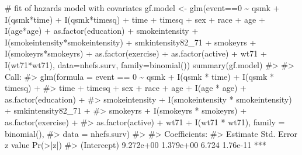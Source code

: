 \documentclass[
  10pt,
  a4paper,
]{book}
\newenvironment{Shaded}{\begin{snugshade}}{\end{snugshade}}
\newcommand{\AttributeTok}[1]{\textcolor[rgb]{0.40,0.45,0.13}{#1}}
\newcommand{\CommentTok}[1]{\textcolor[rgb]{0.37,0.37,0.37}{#1}}
\newcommand{\DecValTok}[1]{\textcolor[rgb]{0.68,0.00,0.00}{#1}}
\newcommand{\FunctionTok}[1]{\textcolor[rgb]{0.28,0.35,0.67}{#1}}
\newcommand{\NormalTok}[1]{\textcolor[rgb]{0.00,0.46,0.62}{#1}}
\newcommand{\OtherTok}[1]{\textcolor[rgb]{0.00,0.46,0.62}{#1}}
\newcommand{\SpecialCharTok}[1]{\textcolor[rgb]{0.37,0.37,0.37}{#1}}
\begin{document}
\begin{Shaded}
\begin{Highlighting}[]
\CommentTok{\# fit of hazards model with covariates}
\NormalTok{gf.model }\OtherTok{\textless{}{-}} \FunctionTok{glm}\NormalTok{(event}\SpecialCharTok{==}\DecValTok{0} \SpecialCharTok{\textasciitilde{}}\NormalTok{ qsmk }\SpecialCharTok{+} \FunctionTok{I}\NormalTok{(qsmk}\SpecialCharTok{*}\NormalTok{time) }\SpecialCharTok{+} \FunctionTok{I}\NormalTok{(qsmk}\SpecialCharTok{*}\NormalTok{timesq)}
                \SpecialCharTok{+}\NormalTok{ time }\SpecialCharTok{+}\NormalTok{ timesq }\SpecialCharTok{+}\NormalTok{ sex }\SpecialCharTok{+}\NormalTok{ race }\SpecialCharTok{+}\NormalTok{ age }\SpecialCharTok{+} \FunctionTok{I}\NormalTok{(age}\SpecialCharTok{*}\NormalTok{age)}
                \SpecialCharTok{+} \FunctionTok{as.factor}\NormalTok{(education) }\SpecialCharTok{+}\NormalTok{ smokeintensity}
                \SpecialCharTok{+} \FunctionTok{I}\NormalTok{(smokeintensity}\SpecialCharTok{*}\NormalTok{smokeintensity) }\SpecialCharTok{+}\NormalTok{ smkintensity82\_71}
                \SpecialCharTok{+}\NormalTok{ smokeyrs }\SpecialCharTok{+} \FunctionTok{I}\NormalTok{(smokeyrs}\SpecialCharTok{*}\NormalTok{smokeyrs) }\SpecialCharTok{+} \FunctionTok{as.factor}\NormalTok{(exercise)}
                \SpecialCharTok{+} \FunctionTok{as.factor}\NormalTok{(active) }\SpecialCharTok{+}\NormalTok{ wt71 }\SpecialCharTok{+} \FunctionTok{I}\NormalTok{(wt71}\SpecialCharTok{*}\NormalTok{wt71),}
                \AttributeTok{data=}\NormalTok{nhefs.surv, }\AttributeTok{family=}\FunctionTok{binomial}\NormalTok{())}
\FunctionTok{summary}\NormalTok{(gf.model)}
\CommentTok{\#\textgreater{} }
\CommentTok{\#\textgreater{} Call:}
\CommentTok{\#\textgreater{} glm(formula = event == 0 \textasciitilde{} qsmk + I(qsmk * time) + I(qsmk * timesq) + }
\CommentTok{\#\textgreater{}     time + timesq + sex + race + age + I(age * age) + as.factor(education) + }
\CommentTok{\#\textgreater{}     smokeintensity + I(smokeintensity * smokeintensity) + smkintensity82\_71 + }
\CommentTok{\#\textgreater{}     smokeyrs + I(smokeyrs * smokeyrs) + as.factor(exercise) + }
\CommentTok{\#\textgreater{}     as.factor(active) + wt71 + I(wt71 * wt71), family = binomial(), }
\CommentTok{\#\textgreater{}     data = nhefs.surv)}
\CommentTok{\#\textgreater{} }
\CommentTok{\#\textgreater{} Coefficients:}
\CommentTok{\#\textgreater{}                                      Estimate Std. Error z value Pr(\textgreater{}|z|)    }
\CommentTok{\#\textgreater{} (Intercept)                         9.272e+00  1.379e+00   6.724 1.76e{-}11 ***}

\end{Highlighting}
\end{Shaded}
\end{document}
